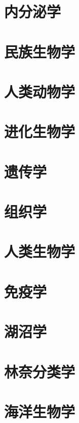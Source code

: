 \documentclass[UTF8]{../NatureUniverse}
\begin{document}
\section{内分泌学}
\section{民族生物学}
\section{人类动物学}
\section{进化生物学}
\section{遗传学}
\section{组织学}
\section{人类生物学}
\section{免疫学}
\section{湖沼学}
\section{林奈分类学}
\section{海洋生物学}
\end{document}
